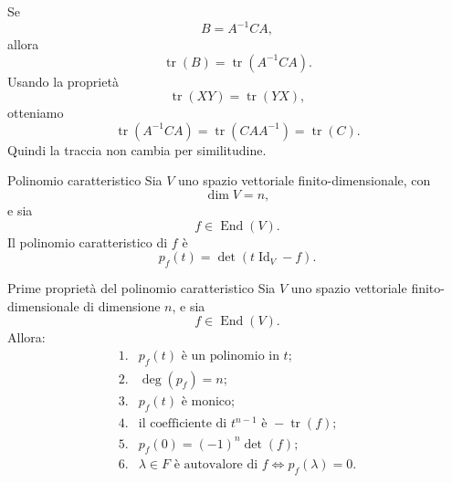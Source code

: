\documentclass[a4paper]{article}
\begin{document}
\begin{snippetproof}{}
    Se
    \[
        B=A^{-1}CA,
    \]
    allora
    \[
        \operatorname{tr}(B)
        =
        \operatorname{tr}(A^{-1}CA).
    \]
    Usando la proprietà
    \[
        \operatorname{tr}(XY)=\operatorname{tr}(YX),
    \]
    otteniamo
    \[
        \operatorname{tr}(A^{-1}CA)
        =
        \operatorname{tr}(CAA^{-1})
        =
        \operatorname{tr}(C).
    \]
    Quindi la traccia non cambia per similitudine.
\end{snippetproof}

\begin{snippetdefinition}{Polinomio caratteristico}
    Sia \(V\) uno spazio vettoriale finito-dimensionale, con
    \[
        \dim V=n,
    \]
    e sia
    \[
        f\in\operatorname{End}(V).
    \]
    Il polinomio caratteristico di \(f\) è
    \[
        p_f(t)=\det(t\operatorname{Id}_V-f).
    \]
\end{snippetdefinition}

\begin{snippetproposition}{Prime proprietà del polinomio caratteristico}
    Sia \(V\) uno spazio vettoriale finito-dimensionale di dimensione \(n\), e sia
    \[
        f\in\operatorname{End}(V).
    \]
    Allora:
    \[
        \begin{array}{ll}
            \text{1.} & p_f(t) \text{ è un polinomio in } t;\\[1mm]
            \text{2.} & \deg(p_f)=n;\\[1mm]
            \text{3.} & p_f(t) \text{ è monico;}\\[1mm]
            \text{4.} & \text{il coefficiente di } t^{n-1} \text{ è } -\operatorname{tr}(f);\\[1mm]
            \text{5.} & p_f(0)=(-1)^n\det(f);\\[1mm]
            \text{6.} & \lambda\in F \text{ è autovalore di } f
            \Longleftrightarrow
            p_f(\lambda)=0.
        \end{array}
    \]
\end{snippetproposition}
\end{document}
